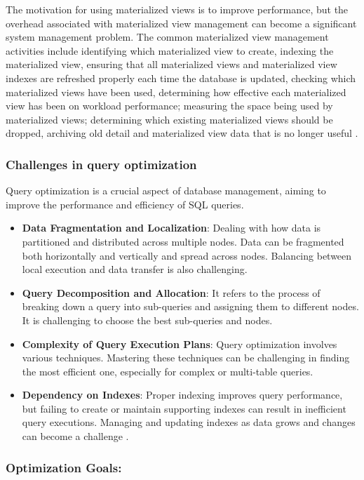 The motivation for using materialized views is to improve performance, but the overhead associated with materialized view management can become a significant system management problem. The common materialized view management activities include identifying which materialized view to create, indexing the materialized view, ensuring that all materialized views and materialized view indexes are refreshed properly each time the database is updated, checking which materialized views have been used, determining how effective each materialized view has been on workload performance; measuring the space being used by materialized views; determining which existing materialized views should be dropped,  archiving old detail and materialized view data that is no longer useful \cite{Ashadevi2008CostEA,1363763}.

\subsubsection{Challenges in query optimization} Query optimization is a crucial aspect of database management, aiming to improve the performance and efficiency of SQL queries.
\begin{itemize}
    \item\textbf{Data Fragmentation and Localization}: Dealing with how data is partitioned and distributed across multiple nodes. Data can be fragmented both horizontally and vertically and spread across nodes. Balancing between local execution and data transfer is also challenging. 
    \item\textbf{Query Decomposition and Allocation}: It refers to the process of breaking down a query into sub-queries and assigning them to different nodes. It is challenging to choose the best sub-queries and nodes.
    \item\textbf{Complexity of Query Execution Plans}: Query optimization involves various techniques. Mastering these techniques can be challenging in finding the most efficient one, especially for complex or multi-table queries.
    \item\textbf{Dependency on Indexes}: Proper indexing improves query performance, but failing to create or maintain supporting indexes can result in inefficient query executions. Managing and updating indexes as data grows and changes can become a challenge \cite{team-2020,etutorials-03-2024,editor-ijmter-2015}.
\end{itemize}
\subsubsection*{Optimization Goals:}


